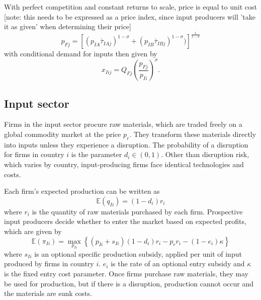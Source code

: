 \documentclass{article}
\begin{document}
With perfect competition and constant returns to scale, price is equal to unit cost [note: this needs to be expressed as a price index, since input producers will 'take it as given' when determining their price]
\begin{equation}
    p_{Fj} = \left[ ( p_{IA} \bar{\tau}_{IAj} )^{1 - \sigma} + ( p_{IB} \bar{\tau}_{IBj} )^{1 - \sigma}) \right]^{\frac{1}{1 - \sigma}}
\end{equation}
with conditional demand for inputs then given by
\begin{equation} \label{eq:input_demand}
    x_{Iij} = Q_{Fj} \left( \frac{p_{Fj}}{p_{Ii}} \right)^{\sigma}.
\end{equation}

\subsection{Input sector}

Firms in the input sector procure raw materials, which are traded freely on a global commodity market at the price $p_r$. They transform these materials directly into inputs unless they experience a disruption. The probability of a disruption for firms in country $i$ is the parameter $d_i \in (0, 1)$. Other than disruption risk, which varies by country, input-producing firms face identical technologies and costs.

Each firm's expected production can be written as
\begin{equation}
    \mathbb{E} (q_{Ii}) = (1 - d_i) r_i
\end{equation}
where $r_i$ is the quantity of raw materials purchased by each firm. Prospective input producers decide whether to enter the market based on expected profits, which are given by
\begin{equation} \label{eq:input_profit}
    \mathbb{E} (\pi_{Ii}) = \max_{p_{Ii}} \left\{ (p_{Ii} + s_{Ii}) (1 - d_i) r_{i} - p_r r_i - (1 - e_i) \kappa \right\}
\end{equation}
where $s_{Ii}$ is an optional specific production subsidy, applied per unit of input produced by firms in country $i$. $e_i$ is the rate of an optional entry subsidy and $\kappa$ is the fixed entry cost parameter. Once firms purchase raw materials, they may be used for production, but if there is a disruption, production cannot occur and the materials are sunk costs.
\end{document}
